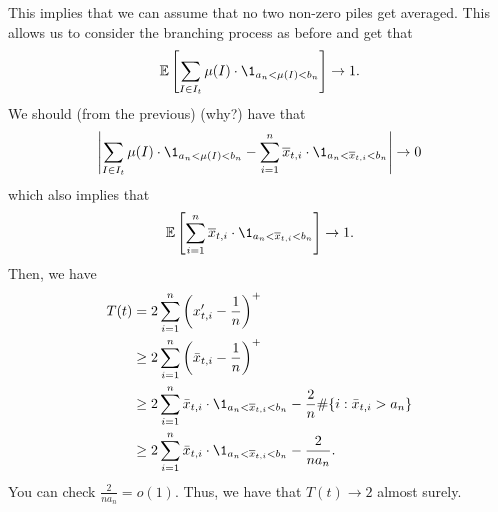\documentclass[12pt]{article}
\begin{document}
This implies that we can assume that no two non-zero piles get averaged. This allows us to consider the branching process as before and get that 
\[
	\EE \left [ \sum_{I \in I_t} \mu(I) \cdot \1_{a_n < \mu(I) < b_n} \right ] \to 1. 	
\]
We should (from the previous) (why?) have that 
\[
	\left | \sum_{I \in I_t} \mu(I) \cdot \1_{a_n < \mu(I) < b_n} - \sum_{i = 1}^n \overline{x}_{t, i} \cdot \1_{a_n < \overline{x}_{t, i} < b_n} \right | \to 0
\]
which also implies that 
\[
	\EE \left [ \sum_{i = 1}^n \overline{x}_{t, i} \cdot \1_{a_n < \overline{x}_{t, i} < b_n} \right ] \to 1.
\]
Then, we have 
\begin{align*}
	T(t) & = 2 \sum_{i = 1}^n \left ( x'_{t, i} - \frac{1}{n} \right )^+ \\
	& \geq 2 \sum_{i = 1}^n \left ( \bar{x}_{t, i} - \frac{1}{n} \right )^+ \\
	& \geq 2 \sum_{i = 1}^n \bar{x}_{t, i} \cdot \1_{a_n < \overline{x}_{t, i} < b_n} - \frac{2}{n} \# \{i : \bar{x}_{t, i} > a_n \} \\
	& \geq 2 \sum_{i = 1}^n \bar{x}_{t, i} \cdot \1_{a_n < \overline{x}_{t, i} < b_n} - \frac{2}{na_n}.
\end{align*}
You can check $\frac{2}{na_n} = o(1)$. Thus, we have that $T(t) \to 2$ almost surely. 



\end{document}
